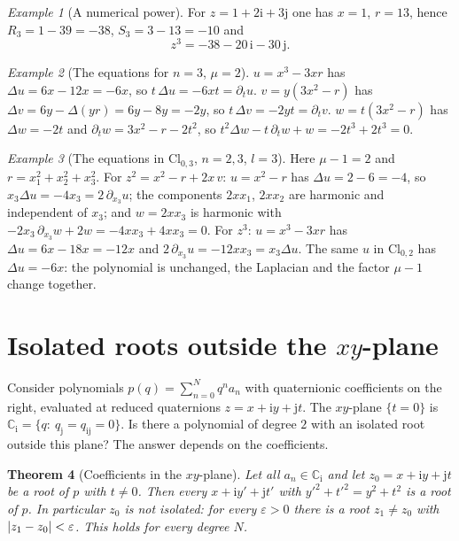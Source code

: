 \documentclass[11pt,a4paper]{article}
\newcommand{\ii}{\mathrm{i}}
\newcommand{\jj}{\mathrm{j}}
\DeclarePairedDelimiter{\abs}{\lvert}{\rvert}
\newtheorem{theorem}{Theorem}
\theoremstyle{remark}
\newtheorem{example}[theorem]{Example}
\begin{document}
\begin{example}[A numerical power]
For $z=1+2\ii+3\jj$ one has $x=1$, $r=13$, hence $R_3=1-39=-38$, $S_3=3-13=-10$ and
\[
  z^3=-38-20\,\ii-30\,\jj .
\]
\end{example}

\begin{example}[The equations for $n=3$, $\mu=2$]
$u=x^3-3xr$ has $\Delta u=6x-12x=-6x$, so $t\,\Delta u=-6xt=\partial_tu$.
$v=y(3x^2-r)$ has $\Delta v=6y-\Delta(yr)=6y-8y=-2y$, so $t\,\Delta v=-2yt=\partial_tv$.
$w=t(3x^2-r)$ has $\Delta w=-2t$ and $\partial_tw=3x^2-r-2t^2$, so
$t^2\Delta w-t\,\partial_tw+w=-2t^3+2t^3=0$.
\end{example}

\begin{example}[The equations in $\mathrm{Cl}_{0,3}$, $n=2,3$, $l=3$]
Here $\mu-1=2$ and $r=x_1^2+x_2^2+x_3^2$. For $z^2=x^2-r+2x\,v$:
$u=x^2-r$ has $\Delta u=2-6=-4$, so $x_3\Delta u=-4x_3=2\,\partial_{x_3}u$; the components
$2xx_1$, $2xx_2$ are harmonic and independent of $x_3$; and $w=2xx_3$ is harmonic with
$-2x_3\,\partial_{x_3}w+2w=-4xx_3+4xx_3=0$.
For $z^3$: $u=x^3-3xr$ has $\Delta u=6x-18x=-12x$ and $2\,\partial_{x_3}u=-12xx_3=x_3\Delta u$.
The same $u$ in $\mathrm{Cl}_{0,2}$ has $\Delta u=-6x$: the polynomial is unchanged, the
Laplacian and the factor $\mu-1$ change together.
\end{example}

\section{Isolated roots outside the $xy$-plane}

Consider polynomials $p(q)=\sum_{n=0}^{N}q^n a_n$ with quaternionic coefficients on the right,
evaluated at reduced quaternions $z=x+\ii y+\jj t$. The $xy$-plane $\{t=0\}$ is
$\mathbb{C}_{\ii}=\{q:\ q_{\jj}=q_{\ii\jj}=0\}$. Is there a polynomial of degree $2$ with an
isolated root outside this plane? The answer depends on the coefficients.

\begin{theorem}[Coefficients in the $xy$-plane]\label{thm:circle}
Let all $a_n\in\mathbb{C}_{\ii}$ and let $z_0=x+\ii y+\jj t$ be a root of $p$ with $t\ne0$. Then
every $x+\ii y'+\jj t'$ with $y'^2+t'^2=y^2+t^2$ is a root of $p$. In particular $z_0$ is not
isolated: for every $\varepsilon>0$ there is a root $z_1\ne z_0$ with $\abs{z_1-z_0}<\varepsilon$.
This holds for every degree $N$.
\end{theorem}
\end{document}
